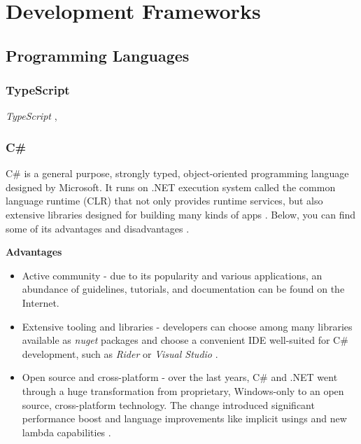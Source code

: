 \chapter{Development Frameworks} \label{ch:development_frameworks}

\section{Programming Languages}

\subsection{TypeScript}
\textit{TypeScript} \cite{type_script},

\subsection{C\#}
C\# is a general purpose, strongly typed, object-oriented programming language designed by Microsoft. It runs on .NET execution system called the common language runtime (CLR) that not only provides runtime services, but also extensive libraries designed for building many kinds of apps \cite{c-sharp-tour}. Below, you can find some of its advantages and disadvantages .

\textbf{Advantages}
\begin{itemize}
    \item Active community - due to its popularity and various applications, an abundance of guidelines, tutorials, and documentation can be found on the Internet.
    \item Extensive tooling and libraries - developers can choose among many libraries available as \textit{nuget} packages and choose a convenient IDE well-suited for C\# development, such as \textit{Rider} or \textit{Visual Studio}  \cite{net-tools} \cite{nuget}.
    \item Open source and cross-platform - over the last years, C\# and .NET went through a huge transformation from proprietary, Windows-only to an open source, cross-platform technology. The change introduced significant performance boost and language improvements like implicit usings and new lambda capabilities \cite{net6}. 
\end{itemize}

